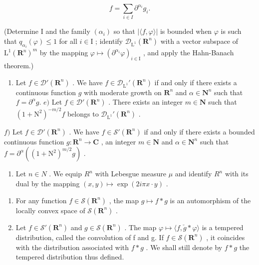 \[
f = \sum_ {i \in I} \partial^ {\alpha_ {i}} g _ {i}.
\]

(Determine I and the family \((\alpha_{i})\) so that \(|\langle f,\varphi\rangle |\) is bounded when \(\varphi\) is such that \(q_{\alpha_i}(\varphi)\leqslant 1\) for all \(i\in \mathrm{I}\) ; identify \(\mathcal{D}_{\mathrm{L}^1}(\mathbf{R}^n)\) with a vector subspace of \(\mathrm{L}^1 (\mathbf{R}^n)^m\) by the mapping \(\varphi \mapsto (\partial^{\alpha_i}\varphi)_{i\in \mathrm{I}}\) , and apply the Hahn-Banach theorem.)

\begin{enumerate}
\def\labelenumi{\alph{enumi})}
\setcounter{enumi}{3}
\tightlist
\item
  Let \(f \in \mathcal{D}'(\mathbf{R}^n)\) . We have \(f \in \mathcal{D}_{\mathrm{L}^1}'(\mathbf{R}^n)\) if and only if there exists a continuous function \(g\) with moderate growth on \(\mathbf{R}^n\) and \(\alpha \in \mathbf{N}^n\) such that \(f = \partial^\alpha g\). \(e)\) Let \(f \in \mathcal{D}'(\mathbf{R}^n)\) . There exists an integer \(m \in \mathbf{N}\) such that \((1 + \mathrm{N}^2)^{-m/2}f\) belongs to \(\mathcal{D}_{\mathrm{L}^1}'(\mathbf{R}^n)\) .
\end{enumerate}

\(f)\) Let \(f \in \mathcal{D}'(\mathbf{R}^n)\) . We have \(f \in \mathcal{S}'(\mathbf{R}^n)\) if and only if there exists a bounded continuous function \(g\colon \mathbf{R}^n \to \mathbf{C}\) , an integer \(m \in \mathbf{N}\) and \(\alpha \in \mathbf{N}^n\) such that \(f = \partial^\alpha((1 + \mathrm{N}^2)^{m/2}g)\) .

\begin{enumerate}
\def\labelenumi{\arabic{enumi})}
\setcounter{enumi}{25}
\tightlist
\item
  Let \(n \in N\) . We equip \(R^{n}\) with Lebesgue measure \(\mu\) and identify \(R^{n}\) with its dual by the mapping \((x, y) \mapsto \exp(2i\pi x \cdot y)\) .
\end{enumerate}

\begin{enumerate}
\def\labelenumi{\alph{enumi})}
\item
  For any function \(f \in \mathcal{S}(\mathbf{R}^n)\) , the map \(g \mapsto f * g\) is an automorphism of the locally convex space of \(\mathcal{S}(\mathbf{R}^n)\) .
\item
  Let \(f \in \mathcal{S}'(\mathbf{R}^{n})\) and \(g \in \mathcal{S}(\mathbf{R}^{n})\) . The map \(\varphi \mapsto \langle f, \check{g} * \varphi \rangle\) is a tempered distribution, called the convolution of f and g. If \(f \in \mathcal{S}(\mathbf{R}^{n})\) , it coincides with the distribution associated with \(f * g\) . We shall still denote by \(f * g\) the tempered distribution thus defined.
\end{enumerate}

